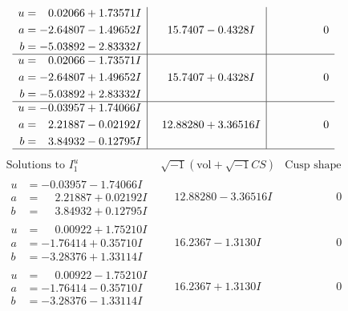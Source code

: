 \documentclass[1p]{elsarticle_modified}
\theoremstyle{definition}
\newcommand{\I}{\sqrt{-1}}
\begin{document}
$$\begin{array}{c|c|c}
\begin{aligned}
u &= \phantom{-}0.02066 + 1.73571 I \\
a &= -2.64807 - 1.49652 I \\
b &= -5.03892 - 2.83332 I\end{aligned}
 & \phantom{-}15.7407 - 0.4328 I & \phantom{-0.000000 } 0 \\ \hline\begin{aligned}
u &= \phantom{-}0.02066 - 1.73571 I \\
a &= -2.64807 + 1.49652 I \\
b &= -5.03892 + 2.83332 I\end{aligned}
 & \phantom{-}15.7407 + 0.4328 I & \phantom{-0.000000 } 0 \\ \hline\begin{aligned}
u &= -0.03957 + 1.74066 I \\
a &= \phantom{-}2.21887 - 0.02192 I \\
b &= \phantom{-}3.84932 - 0.12795 I\end{aligned}
 & \phantom{-}12.88280 + 3.36516 I & \phantom{-0.000000 } 0\\
 \hline 
 \end{array}$$\newpage$$\begin{array}{c|c|c}  
\text{Solutions to }I^u_{1}& \I (\text{vol} + \sqrt{-1}CS) & \text{Cusp shape}\\
 \hline 
\begin{aligned}
u &= -0.03957 - 1.74066 I \\
a &= \phantom{-}2.21887 + 0.02192 I \\
b &= \phantom{-}3.84932 + 0.12795 I\end{aligned}
 & \phantom{-}12.88280 - 3.36516 I & \phantom{-0.000000 } 0 \\ \hline\begin{aligned}
u &= \phantom{-}0.00922 + 1.75210 I \\
a &= -1.76414 + 0.35710 I \\
b &= -3.28376 + 1.33114 I\end{aligned}
 & \phantom{-}16.2367 - 1.3130 I & \phantom{-0.000000 } 0 \\ \hline\begin{aligned}
u &= \phantom{-}0.00922 - 1.75210 I \\
a &= -1.76414 - 0.35710 I \\
b &= -3.28376 - 1.33114 I\end{aligned}
 & \phantom{-}16.2367 + 1.3130 I & \phantom{-0.000000 } 0 \\ \hline\begin{aligned}

\end{aligned}
\end{array}$$
\end{document}
